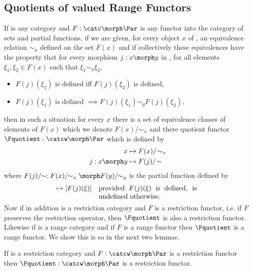 \subsection{Quotients of \Par valued  Range Functors}
If \catcw is any category and  $F: \catc \morph \Par$ is any functor into the category of sets and partial functions,
if we are given,  for every object $x$ of \catcw, an equivalence relation $\sim_x$ defined on the set $F(x)$ and if collectively these equivalences 
have the property that
for every morphism $j:x \morph y$ in \catc, 
for all elements $\xi_1,\xi_2 \in F(x)$
such that $\xi_1 \sim_x \xi_2$,
\begin{itemize}
\item $F(j)(\xi_1)$ is defined iff $F(j)(\xi_2)$ is defined, 
\item $F(j)(\xi_1) \mbox{ is defined } \implies F(j)(\xi_1) \sim_y F(j)(\xi_2),$
\end{itemize}
then in such a situation for every $x$ there is 
a set of equivalence classes of elements of $F(x)$ which we denote
$F(x)/\!\!\sim_x$ and there
quotient functor
 $\Fquotient: \catcw \morph \Par$ which is defined by
\begin{align*}
x             &\mapsto F(x)/\!\sim_x\\
j: x \morph y &\mapsto F(j)/\!\sim
\end{align*} 
where $F(j)/\!\!\sim:F(x)/\!\!\sim_x \morph F(y)/\!\!\sim_y$ is the partial function defined by
\begin{align*}
[\xi] \mapsto [F(j)(\xi)] 
              && \mbox{\parbox[t]{5cm}{provided $F(j)(\xi)$ is defined, 
                                       is undefined otherwise.}
                       }
\end{align*}
Now if in addition \catcw is a restriction category 
and $F$ is a restriction functor,
i.e. if $F$ preserves the restriction operator, 
then $\Fquotient$ is also a restriction functor. 
Likewise if \catcw is a range category 
and if $F$ is a range functor then $\Fquotient$ is a range functor. 
We show this is so in the next two lemmas.
\begin{lemma}
If \catcw is a restriction category and $F: \catcw \morph \Par$ 
is a restriction functor then $\Fquotient:\catcw \morph \Par$ is a restriction functor.
\end{lemma}
